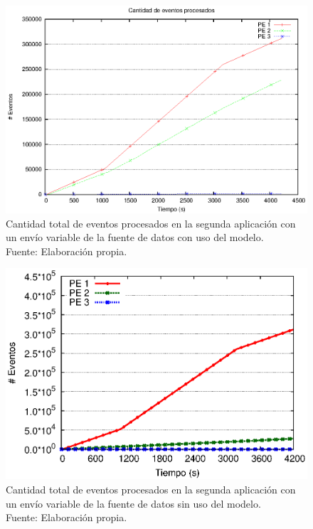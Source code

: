 \begin{figure}[!ht]
	\centering
	\captionsetup{justification=centering}
    \includegraphics[scale=0.7]{images/exp/app2/normal/cm/eventCount.eps}
    \caption[Cantidad total de eventos procesados en la segunda aplicación con un envío variable de la fuente de datos con uso del modelo.]{Cantidad total de eventos procesados en la segunda aplicación con un envío variable de la fuente de datos con uso del modelo.\\Fuente: Elaboración propia.}
    \label{fig:app2-normal-eventCount-cm}
\end{figure}

\begin{figure}[!ht]
	\centering
	\captionsetup{justification=centering}
    \includegraphics[scale=0.7]{images/exp/app2/normal/sm/eventCount.eps}
    \caption[Cantidad total de eventos procesados en la segunda aplicación con un envío variable de la fuente de datos sin uso del modelo.]{Cantidad total de eventos procesados en la segunda aplicación con un envío variable de la fuente de datos sin uso del modelo.\\Fuente: Elaboración propia.}
    \label{fig:app2-normal-eventCount-sm}
\end{figure}

